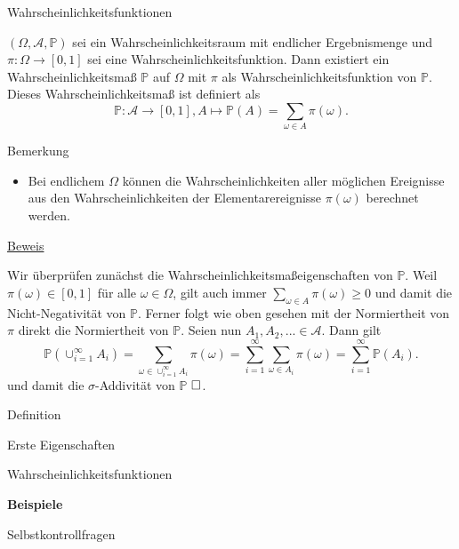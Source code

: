 \documentclass[
  8pt,
  ignorenonframetext,
]{beamer}
\providecommand{\tightlist}{%
  \setlength{\itemsep}{0pt}\setlength{\parskip}{0pt}}
\begin{document}
\begin{frame}{Wahrscheinlichkeitsfunktionen}
\protect\hypertarget{wahrscheinlichkeitsfunktionen-1}{}
\footnotesize
\begin{theorem}
\justifying
\normalfont
$(\Omega, \mathcal{A}, \mathbb{P})$ sei ein Wahrscheinlichkeitsraum mit endlicher
Ergebnismenge und $\pi: \Omega \to [0,1]$ sei eine Wahrscheinlichkeitsfunktion.
Dann existiert ein Wahrscheinlichkeitsmaß $\mathbb{P}$ auf $\Omega$ mit
$\pi$ als Wahrscheinlichkeitsfunktion von $\mathbb{P}$. Dieses Wahrscheinlichkeitsmaß
ist definiert als
\begin{equation}
\mathbb{P} : \mathcal{A} \to [0,1], A \mapsto \mathbb{P}(A) = \sum_{\omega \in A} \pi(\omega).
\end{equation}
\end{theorem}
\footnotesize

Bemerkung

\begin{itemize}
\tightlist
\item
  \justifying Bei endlichem \(\Omega\) können die Wahrscheinlichkeiten
  aller möglichen Ereignisse aus den Wahrscheinlichkeiten der
  Elementarereignisse \(\pi(\omega)\) berechnet werden.
\end{itemize}

\underline{Beweis}

Wir überprüfen zunächst die Wahrscheinlichkeitsmaßeigenschaften von
\(\mathbb{P}\). Weil \(\pi(\omega) \in [0,1]\) für alle
\(\omega \in \Omega\), gilt auch immer
\(\sum_{\omega \in A} \pi(\omega) \ge 0\) und damit die
Nicht-Negativität von \(\mathbb{P}\). Ferner folgt wie oben gesehen mit
der Normiertheit von \(\pi\) direkt die Normiertheit von \(\mathbb{P}\).
Seien nun \(A_1, A_2,... \in \mathcal{A}\). Dann gilt \begin{equation}
\mathbb{P}\left(\cup_{i=1}^\infty A_i \right)
= \sum_{\omega \in \cup_{i=1}^\infty A_i} \pi(\omega)
= \sum_{i = 1}^\infty \sum_{\omega \in A_i} \pi(\omega)
= \sum_{i = 1}^\infty \mathbb{P}(A_i).
\end{equation} und damit die \(\sigma\)-Addivität von \(\mathbb{P}\)
\(\hfill\Box\).
\end{frame}

\begin{frame}{}
\protect\hypertarget{section-9}{}
\large
\vfill

Definition

Erste Eigenschaften

Wahrscheinlichkeitsfunktionen

\textbf{Beispiele}

Selbstkontrollfragen \vfill
\end{frame}
\end{document}
